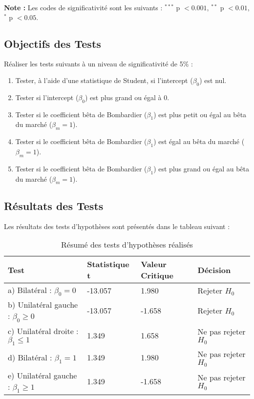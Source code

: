 \documentclass[14pt]{extarticle} %
\theoremstyle{definition}
\theoremstyle{plain}
\begin{document}
\noindent \textbf{Note :} Les codes de significativité sont les suivants : $^{***}$ p $< 0.001$, $^{**}$ p $< 0.01$, $^{*}$ p $< 0.05$.

\subsection{Objectifs des Tests}

Réaliser les tests suivants à un niveau de significativité de 5\% :

\begin{enumerate}
    \item Tester, à l'aide d'une statistique de Student, si l'intercept (\(\beta_0\)) est nul.
    \item Tester si l'intercept (\(\beta_0\)) est plus grand ou égal à 0.
    \item Tester si le coefficient bêta de Bombardier (\(\beta_1\)) est plus petit ou égal au bêta du marché (\(\beta_m = 1\)).
    \item Tester si le coefficient bêta de Bombardier (\(\beta_1\)) est égal au bêta du marché (\(\beta_m = 1\)).
    \item Tester si le coefficient bêta de Bombardier (\(\beta_1\)) est plus grand ou égal au bêta du marché (\(\beta_m = 1\)).
\end{enumerate}

\subsection{Résultats des Tests}

Les résultats des tests d'hypothèses sont présentés dans le tableau suivant :

\begin{landscape}
\begin{table}[h!]
    \centering
    \begin{tabular}{@{}llll@{}}
        \toprule
        \textbf{Test} & \textbf{Statistique t} & \textbf{Valeur Critique} & \textbf{Décision} \\ \midrule
        a) Bilatéral : \(\beta_0 = 0\) & -13.057 & 1.980 & Rejeter \(H_0\) \\
        b) Unilatéral gauche : \(\beta_0 \geq 0\) & -13.057 & -1.658 & Rejeter \(H_0\) \\
        c) Unilatéral droite : \(\beta_1 \leq 1\) & 1.349 & 1.658 & Ne pas rejeter \(H_0\) \\
        d) Bilatéral : \(\beta_1 = 1\) & 1.349 & 1.980 & Ne pas rejeter \(H_0\) \\
        e) Unilatéral gauche : \(\beta_1 \geq 1\) & 1.349 & -1.658 & Ne pas rejeter \(H_0\) \\ \bottomrule
    \end{tabular}
    \caption{Résumé des tests d'hypothèses réalisés}
\end{table}
\end{landscape}
\end{document}
